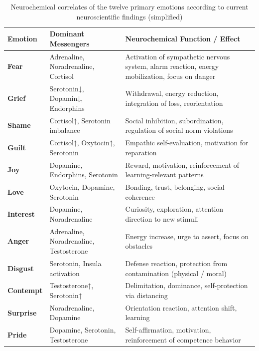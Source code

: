 \begin{table}[H]
    \renewcommand{\arraystretch}{1.5}
    \centering
    \begin{tabular}{L{3cm}|L{6cm}|L{6cm}}
        \textbf{Emotion} & \textbf{Dominant Messengers} & \textbf{Neurochemical Function / Effect} \\
        \hline
        \textbf{Fear} & Adrenaline, Noradrenaline, Cortisol & Activation of sympathetic nervous system, alarm reaction, energy mobilization, focus on danger \\
        \textbf{Grief} & Serotonin↓, Dopamin↓, Endorphins & Withdrawal, energy reduction, integration of loss, reorientation \\
        \textbf{Shame} & Cortisol↑, Serotonin imbalance & Social inhibition, subordination, regulation of social norm violations \\
        \textbf{Guilt} & Cortisol↑, Oxytocin↑, Serotonin & Empathic self-evaluation, motivation for reparation \\
        \textbf{Joy} & Dopamine, Endorphins, Serotonin & Reward, motivation, reinforcement of learning-relevant patterns \\
        \textbf{Love} & Oxytocin, Dopamine, Serotonin & Bonding, trust, belonging, social coherence \\
        \textbf{Interest} & Dopamine, Noradrenaline & Curiosity, exploration, attention direction to new stimuli \\
        \textbf{Anger} & Adrenaline, Noradrenaline, Testosterone & Energy increase, urge to assert, focus on obstacles \\
        \textbf{Disgust} & Serotonin, Insula activation & Defense reaction, protection from contamination (physical / moral) \\
        \textbf{Contempt} & Testosterone↑, Serotonin↑ & Delimitation, dominance, self-protection via distancing \\
        \textbf{Surprise} & Noradrenaline, Dopamine & Orientation reaction, attention shift, learning \\
        \textbf{Pride} & Dopamine, Serotonin, Testosterone & Self-affirmation, motivation, reinforcement of competence behavior \\
    \end{tabular}
    \caption{Neurochemical correlates of the twelve primary emotions according to current neuroscientific findings (simplified)}
    \label{tab:neurochemie_primäremotionen}
\end{table}

